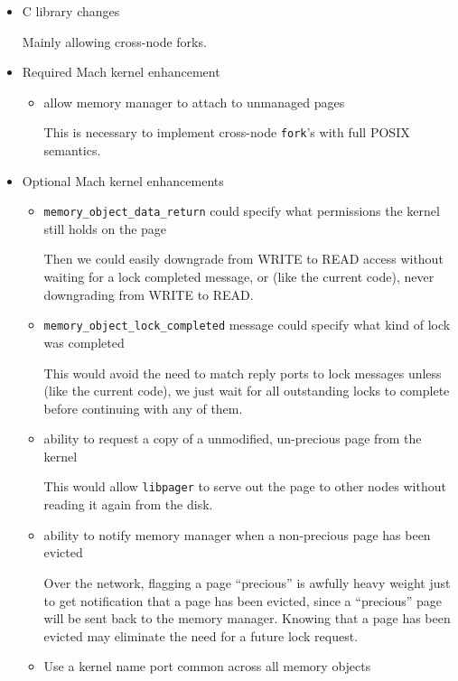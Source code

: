 \documentclass{article}
\def\libpager{{\tt libpager}\xspace}
\def\moreturn{{\tt memory_object_data_return}\xspace}
\def\molockcompleted{{\tt memory_object_lock_completed}\xspace}
\begin{document}
\begin{itemize}
\item C library changes

Mainly allowing cross-node forks.

\item Required Mach kernel enhancement

\begin{itemize}

\item allow memory manager to attach to unmanaged pages

  This is necessary to implement cross-node {\tt fork}'s with full POSIX semantics.

\end{itemize}

\item Optional Mach kernel enhancements

\begin{itemize}

\item \moreturn could specify what permissions the kernel still holds on the page

  Then we could easily downgrade from WRITE to READ access without
  waiting for a lock completed message, or (like the current code),
  never downgrading from WRITE to READ.

\item \molockcompleted message could specify what kind of lock was completed

  This would avoid the need to match reply ports to lock messages
  unless (like the current code), we just wait for all outstanding
  locks to complete before continuing with any of them.

\item ability to request a copy of a unmodified, un-precious page from the kernel

  This would allow \libpager to serve out the page to other nodes without reading it again from the disk.

\item ability to notify memory manager when a non-precious page has been evicted

  Over the network, flagging a page ``precious'' is awfully heavy
  weight just to get notification that a page has been evicted, since
  a ``precious'' page will be sent back to the memory manager.
  Knowing that a page has been evicted may eliminate the need for a
  future lock request.

\item Use a kernel name port common across all memory objects


\end{itemize}
\end{itemize}
\end{document}
